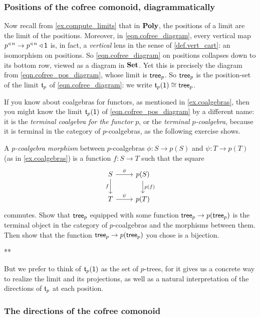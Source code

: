 \documentclass[Book-Poly]{subfiles}
\begin{document}
\subsubsection{Positions of the cofree comonoid, diagrammatically}

Now recall from \cref{ex.compute_limits} that in $\mathbf{Poly}$, the positions of a limit are the limit of the positions.
Moreover, in \eqref{eqn.cofree_diagram}, every vertical map $p^{\mathbin{\triangleleft}\,n}\to p^{\mathbin{\triangleleft}\,n}\mathbin{\triangleleft}\textsf{1}$ is, in fact, a \emph{vertical} lens in the sense of \cref{def.vert_cart}: an isomorphism on positions.
So \eqref{eqn.cofree_diagram} on positions collapses down to its bottom row, viewed as a diagram in $\mathbf{Set}$.
Yet this is precisely the diagram from \eqref{eqn.cofree_pos_diagram}, whose limit is $\mathsf{tree}_p$.
So $\mathsf{tree}_p$ is the position-set of the limit $\mathfrak{t}_p$ of \eqref{eqn.cofree_diagram}: we write $\mathfrak{t}_p(\textsf{1})\cong\mathsf{tree}_p$.

If you know about coalgebras for functors, as mentioned in \cref{ex.coalgebras}, then you might know the limit $\mathfrak{t}_p(\textsf{1})$ of \eqref{eqn.cofree_pos_diagram} by a different name: it is the \emph{terminal coalgebra for the functor} $p$, or the \emph{terminal $p$-coalgebra}, because it is terminal in the category of $p$-coalgebras, as the following exercise shows.

\begin{exercise}
A \emph{$p$-coalgebra morphism} between $p$-coalgebras $\phi\colon S\to p(S)$ and $\psi\colon T\to p(T)$ (as in \cref{ex.coalgebras}) is a function $f\colon S\to T$ such that the square
\[
\begin{tikzcd}
    S \ar[r,"\phi"] \ar[d,"f"'] & p(S) \ar[d,"p(f)"] \\
    T \ar[r,"\psi"] & p(T)
\end{tikzcd}
\]
commutes.
Show that $\mathsf{tree}_p$ equipped with some function $\mathsf{tree}_p\to p(\mathsf{tree}_p)$ is the terminal object in the category of $p$-coalgebras and the morphisms between them.
Then show that the function $\mathsf{tree}_p\to p(\mathsf{tree}_p)$ you chose is a bijection.
\begin{solution}
**
\end{solution}
\end{exercise}
But we prefer to think of $\mathfrak{t}_p(\textsf{1})$ as the set of $p$-trees, for it gives us a concrete way to realize the limit and its projections, as well as a natural interpretation of the directions of $\mathfrak{t}_p$ at each position.

\subsubsection{The directions of the cofree comonoid}
\end{document}
